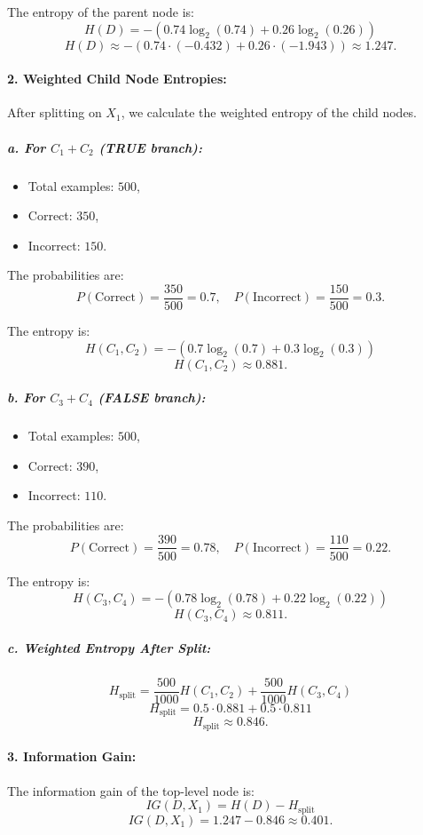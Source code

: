\documentclass[10pt,a4paper]{article}
\begin{document}
The entropy of the parent node is:
\[
H(D) = - \left( 0.74 \log_2(0.74) + 0.26 \log_2(0.26) \right)
\]
\[
H(D) \approx - \left( 0.74 \cdot (-0.432) + 0.26 \cdot (-1.943) \right) \approx 1.247.
\]

\paragraph{2. Weighted Child Node Entropies:}
After splitting on \(X_1\), we calculate the weighted entropy of the child nodes.

\subparagraph{a. For \(C_1 + C_2\) (TRUE branch):}
\begin{itemize}
    \item Total examples: \(500\),
    \item Correct: \(350\),
    \item Incorrect: \(150\).
\end{itemize}

The probabilities are:
\[
P(\text{Correct}) = \frac{350}{500} = 0.7, \quad P(\text{Incorrect}) = \frac{150}{500} = 0.3.
\]

The entropy is:
\[
H(C_1, C_2) = - \left( 0.7 \log_2(0.7) + 0.3 \log_2(0.3) \right)
\]
\[
H(C_1, C_2) \approx 0.881.
\]

\subparagraph{b. For \(C_3 + C_4\) (FALSE branch):}
\begin{itemize}
    \item Total examples: \(500\),
    \item Correct: \(390\),
    \item Incorrect: \(110\).
\end{itemize}

The probabilities are:
\[
P(\text{Correct}) = \frac{390}{500} = 0.78, \quad P(\text{Incorrect}) = \frac{110}{500} = 0.22.
\]

The entropy is:
\[
H(C_3, C_4) = - \left( 0.78 \log_2(0.78) + 0.22 \log_2(0.22) \right)
\]
\[
H(C_3, C_4) \approx 0.811.
\]

\subparagraph{c. Weighted Entropy After Split:}
\[
H_{\text{split}} = \frac{500}{1000} H(C_1, C_2) + \frac{500}{1000} H(C_3, C_4)
\]
\[
H_{\text{split}} = 0.5 \cdot 0.881 + 0.5 \cdot 0.811
\]
\[
H_{\text{split}} \approx 0.846.
\]

\paragraph{3. Information Gain:}
The information gain of the top-level node is:
\[
IG(D, X_1) = H(D) - H_{\text{split}}
\]
\[
IG(D, X_1) = 1.247 - 0.846 \approx 0.401.
\]
\end{document}
